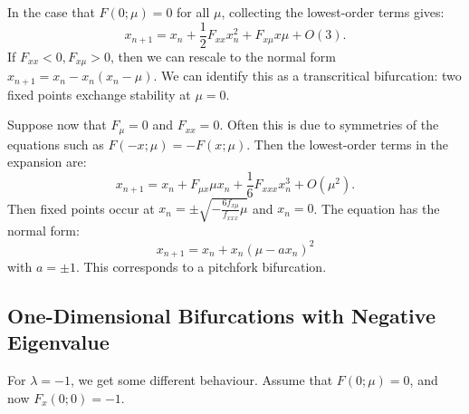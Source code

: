 \documentclass[../Main.tex]{subfiles}
\begin{document}
In the case that $F(0;\mu) = 0$ for all $\mu$, collecting the lowest-order terms gives:
\begin{equation*}
    x_{n+1} = x_n + \frac12 F_{xx} x_n^2 + F_{x\mu} x\mu + O(3).
\end{equation*}
If $F_{xx} < 0, F_{x\mu} > 0$, then we can rescale to the normal form $x_{n+1} = x_n - x_n(x_n -\mu)$. We can identify this as a transcritical bifurcation: two fixed points exchange stability at $\mu = 0$.

Suppose now that $F_\mu = 0$ and $F_{xx} = 0$. Often this is due to symmetries of the equations such as $F(-x;\mu) = -F(x;\mu)$. Then the lowest-order terms in the expansion are:
\begin{equation*}
    x_{n+1} = x_n + F_{\mu x} \mu x_n + \frac16 F_{xxx}x_n^3 + O(\mu^2).
\end{equation*}
Then fixed points occur at $x_n = \pm \sqrt{-\frac{6f_{x\mu}}{f_{xxx}}\mu}$ and $x_n = 0$. The equation has the normal form:
\begin{equation*}
    x_{n+1} = x_n + x_n(\mu - ax_n)^2
\end{equation*}
with $a = \pm 1$. This corresponds to a pitchfork bifurcation.
\subsection{One-Dimensional Bifurcations with Negative Eigenvalue}
For $\lambda = -1$, we get some different behaviour. Assume that $F(0;\mu) = 0$, and now $F_x(0;0) = -1$.
\end{document}
